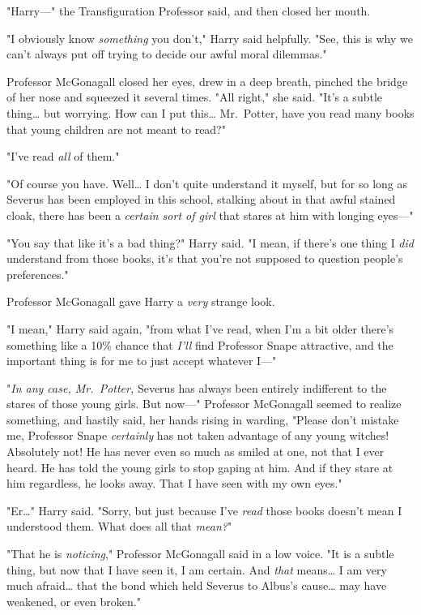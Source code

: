 "Harry---" the Transfiguration Professor said, and then closed her mouth.

"I obviously know \emph{something} you don't," Harry said helpfully. "See, this 
is why we can't always put off trying to decide our awful moral dilemmas."

Professor McGonagall closed her eyes, drew in a deep breath, pinched the bridge 
of her nose and squeezed it several times. "All right," she said. "It's a 
subtle thing{\ldots} but worrying. How can I put this{\ldots} Mr.~Potter, have 
you read many books that young children are not meant to read?"

"I've read \emph{all} of them."

"Of course you have. Well{\ldots} I don't quite understand it myself, but for 
so long as Severus has been employed in this school, stalking about in that 
awful stained cloak, there has been a \emph{certain sort of girl} that stares 
at him with longing eyes---"

"You say that like it's a bad thing?" Harry said. "I mean, if there's one thing 
I \emph{did} understand from those books, it's that you're not supposed to 
question people's preferences."

Professor McGonagall gave Harry a \emph{very} strange look.

"I mean," Harry said again, "from what I've read, when I'm a bit older there's 
something like a 10\% chance that \emph{I'll} find Professor Snape attractive, 
and the important thing is for me to just accept whatever I---"

"\emph{In any case, Mr.~Potter,} Severus has always been entirely indifferent 
to the stares of those young girls. But now---" Professor McGonagall seemed to 
realize something, and hastily said, her hands rising in warding, "Please don't 
mistake me, Professor Snape \emph{certainly} has not taken advantage of any 
young witches! Absolutely not! He has never even so much as smiled at one, not 
that I ever heard. He has told the young girls to stop gaping at him. And if 
they stare at him regardless, he looks away. That I have seen with my own eyes."

"Er{\ldots}" Harry said. "Sorry, but just because I've \emph{read} those books 
doesn't mean I understood them. What does all that \emph{mean?}"

"That he is \emph{noticing}," Professor McGonagall said in a low voice. "It is 
a subtle thing, but now that I have seen it, I am certain. And \emph{that} 
means{\ldots} I am very much afraid{\ldots} that the bond which held Severus to 
Albus's cause{\ldots} may have weakened, or even broken."


